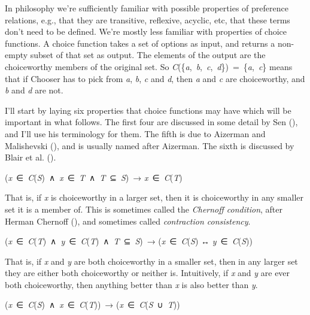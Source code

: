 \documentclass[
  10.5pt,
  twoside]{article}
\providecommand{\tightlist}{%
  \setlength{\itemsep}{0pt}\setlength{\parskip}{0pt}}
\let\olddescription\description
\let\endolddescription\enddescription
\renewenvironment{description}
  {\vskip 5pt\olddescription}
  {\endolddescription\vskip 5pt}
\begin{document}
In philosophy we're sufficiently familiar with possible properties of
preference relations, e.g., that they are transitive, reflexive,
acyclic, etc, that these terms don't need to be defined. We're mostly
less familiar with properties of choice functions. A choice function
takes a set of options as input, and returns a non-empty subset of that
set as output. The elements of the output are the choiceworthy members
of the original set. So
\emph{C}(\{\emph{a},~\emph{b},~\emph{c},~\emph{d}\})~=~\{\emph{a},~\emph{c}\}
means that if Chooser has to pick from \emph{a}, \emph{b}, \emph{c} and
\emph{d}, then \emph{a} and \emph{c} are choiceworthy, and \emph{b} and
\emph{d} are not.

I'll start by laying six properties that choice functions may have which
will be important in what follows. The first four are discussed in some
detail by Sen (), and I'll use
his terminology for them. The fifth is due to Aizerman and Malishevski
(), and is usually named after
Aizerman. The sixth is discussed by Blair et al.
().

\begin{description}
\tightlist
\item[Property α]
(\emph{x}~∈~\emph{C}(\emph{S})~∧~\emph{x}~∈~\emph{T}~∧~\emph{T}~⊆~\emph{S})~→
\emph{x}~∈~\emph{C}(\emph{T})
\end{description}

That is, if \emph{x} is choiceworthy in a larger set, then it is
choiceworthy in any smaller set it is a member of. This is sometimes
called the \emph{Chernoff condition}, after Herman Chernoff
(), and sometimes called
\emph{contraction consistency}.

\begin{description}
\tightlist
\item[Property β]
(\emph{x}~∈~\emph{C}(\emph{T})~∧~\emph{y}~∈~\emph{C}(\emph{T})~∧~\emph{T}~⊆~\emph{S})~→
(\emph{x}~∈~\emph{C}(\emph{S}) ↔ \emph{y}~∈~\emph{C}(\emph{S}))
\end{description}

That is, if \emph{x} and \emph{y} are both choiceworthy in a smaller
set, then in any larger set they are either both choiceworthy or neither
is. Intuitively, if \emph{x} and \emph{y} are ever both choiceworthy,
then anything better than \emph{x} is also better than \emph{y}.

\begin{description}
\tightlist
\item[Property γ]
(\emph{x}~∈~\emph{C}(\emph{S})~∧~\emph{x}~∈~\emph{C}(\emph{T}))~→
(\emph{x}~∈~\emph{C}(\emph{S}~∪~\emph{T}))
\end{description}
\end{document}
